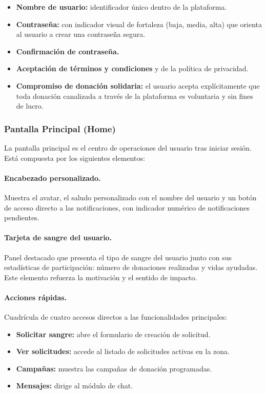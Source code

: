 \documentclass[12pt, a4paper]{article}
\begin{document}
\begin{itemize}
    \item \textbf{Nombre de usuario:} identificador único dentro de la plataforma.
    \item \textbf{Contraseña:} con indicador visual de fortaleza (baja, media, alta) que orienta al usuario a crear una contraseña segura.
    \item \textbf{Confirmación de contraseña.}
    \item \textbf{Aceptación de términos y condiciones} y de la política de privacidad.
    \item \textbf{Compromiso de donación solidaria:} el usuario acepta explícitamente que toda donación canalizada a través de la plataforma es voluntaria y sin fines de lucro.
\end{itemize}

\subsubsection{Pantalla Principal (Home)}

La pantalla principal es el centro de operaciones del usuario tras iniciar sesión. Está compuesta por los siguientes elementos:

\paragraph{Encabezado personalizado.}
Muestra el avatar, el saludo personalizado con el nombre del usuario y un botón de acceso directo a las notificaciones, con indicador numérico de notificaciones pendientes.

\paragraph{Tarjeta de sangre del usuario.}
Panel destacado que presenta el tipo de sangre del usuario junto con sus estadísticas de participación: número de donaciones realizadas y vidas ayudadas. Este elemento refuerza la motivación y el sentido de impacto.

\paragraph{Acciones rápidas.}
Cuadrícula de cuatro accesos directos a las funcionalidades principales:

\begin{itemize}
    \item \textbf{Solicitar sangre:} abre el formulario de creación de solicitud.
    \item \textbf{Ver solicitudes:} accede al listado de solicitudes activas en la zona.
    \item \textbf{Campañas:} muestra las campañas de donación programadas.
    \item \textbf{Mensajes:} dirige al módulo de chat.
\end{itemize}
\end{document}

